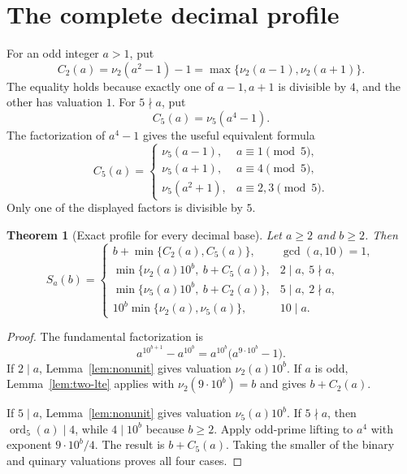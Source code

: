 \documentclass[11pt,a4paper]{article}
\newtheorem{theorem}{Theorem}[section]
\theoremstyle{definition}
\newcommand{\ord}{\operatorname{ord}}
\begin{document}
\section{The complete decimal profile}\label{sec:profile}

For an odd integer $a>1$, put
\begin{equation}\label{eq:c2}
C_2(a)=\nu_2(a^2-1)-1
      =\max\{\nu_2(a-1),\nu_2(a+1)\}.
\end{equation}
The equality holds because exactly one of $a-1,a+1$ is divisible by $4$,
and the other has valuation $1$. For $5\nmid a$, put
\begin{equation}\label{eq:c5}
C_5(a)=\nu_5(a^4-1).
\end{equation}
The factorization of $a^4-1$ gives the useful equivalent formula
\begin{equation}\label{eq:c5-split}
C_5(a)=
\begin{cases}
\nu_5(a-1),&a\equiv1\pmod5,\\
\nu_5(a+1),&a\equiv4\pmod5,\\
\nu_5(a^2+1),&a\equiv2,3\pmod5.
\end{cases}
\end{equation}
Only one of the displayed factors is divisible by $5$.

\begin{theorem}[Exact profile for every decimal base]\label{thm:profile}
Let $a\ge2$ and $b\ge2$. Then
\begin{equation}\label{eq:profile}
S_a(b)=
\begin{cases}
b+\min\{C_2(a),C_5(a)\},&\gcd(a,10)=1,\\[2pt]
\min\{\nu_2(a)10^b,\ b+C_5(a)\},&2\mid a,\ 5\nmid a,\\[2pt]
\min\{\nu_5(a)10^b,\ b+C_2(a)\},&5\mid a,\ 2\nmid a,\\[2pt]
10^b\min\{\nu_2(a),\nu_5(a)\},&10\mid a.
\end{cases}
\end{equation}
\end{theorem}
\begin{proof}
The fundamental factorization is
\begin{equation}\label{eq:factorization}
a^{10^{b+1}}-a^{10^b}=a^{10^b}\bigl(a^{9\cdot10^b}-1\bigr).
\end{equation}
If $2\mid a$, Lemma~\ref{lem:nonunit} gives valuation $\nu_2(a)10^b$.
If $a$ is odd, Lemma~\ref{lem:two-lte} applies with
$\nu_2(9\cdot10^b)=b$ and gives $b+C_2(a)$.

If $5\mid a$, Lemma~\ref{lem:nonunit} gives valuation $\nu_5(a)10^b$.
If $5\nmid a$, then $\ord_5(a)\mid4$, while $4\mid10^b$ because $b\ge2$.
Apply odd-prime lifting to $a^4$ with exponent $9\cdot10^b/4$.
The result is $b+C_5(a)$.
Taking the smaller of the binary and quinary valuations proves all four
cases.
\end{proof}
\end{document}
